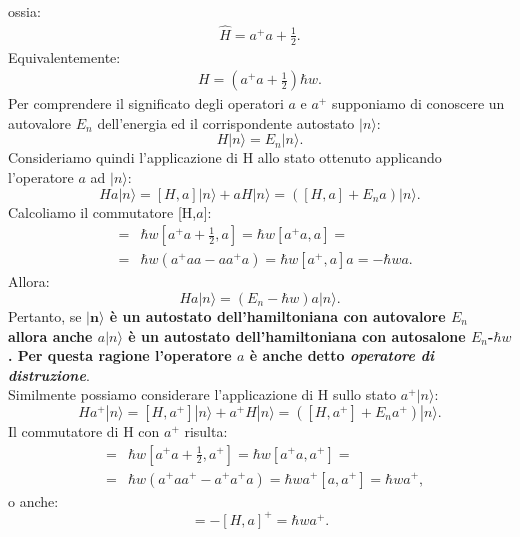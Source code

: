 ossia:
\begin{equation} 
\begin{split}
	\hat{H} =a^+a +\frac{1}{2}.
\end{split}
\end{equation}
Equivalentemente:
\begin{equation} \label{eq:cap11_6}
\begin{split}
	H =(a^+a+ \frac{1}{2}) \hbar w.
\end{split}
\end{equation}
Per comprendere il significato degli operatori $a$ e $a^+$ supponiamo di conoscere un autovalore $E_n$  dell'energia ed il corrispondente autostato $|n \rangle$:
\begin{equation}
H|n\rangle=E_n|n\rangle.
\end{equation}
Consideriamo quindi l'applicazione di H allo stato ottenuto applicando l'operatore $a$ ad $|n\rangle$:
\begin{equation}
Ha|n\rangle= [H,a]|n \rangle+aH|n\rangle=([H,a]+E_na)|n\rangle.
\end{equation}
Calcoliamo il commutatore [H,$a$]:
\begin{eqnarray}
	[H,a]&=&\hbar w[a^+a+\frac{1}{2},a]=\hbar w [a^+a,a]= \nonumber\\
	&=&\hbar w (a^+aa-aa^+a)=\hbar w[a^+,a]a=-\hbar wa.
\end{eqnarray}
Allora:
\begin{equation}
Ha|n\rangle=(E_n-\hbar w)a|n\rangle.
\end{equation}
Pertanto, se \textbf{$\mathbf{|n\rangle}$ è un autostato dell'hamiltoniana con autovalore $E_n$ allora anche $a|n\rangle$ è  un autostato dell'hamiltoniana con autosalone $E_n$-$\hbar w$. Per questa ragione l'operatore $a$ è anche detto \textit{operatore di distruzione}}.  \\
 Similmente possiamo considerare l'applicazione di H sullo stato $a^+|n\rangle$:
\begin{equation}
Ha^+|n\rangle= [H,a^+]|n\rangle+a^+H|n\rangle=([H,a^+]+E_na^+)|n\rangle.
\end{equation}
Il commutatore di H con $a^+$ risulta:
\begin{eqnarray}
	[H,a^+]&=&\hbar w[a^+a+\frac{1}{2},a^+]=\hbar w [a^+a,a^+]= \nonumber\\
	&=&\hbar w (a^+aa^+-a^+a^+a)=\hbar w a^+ [a,a^+]=\hbar wa^+,
\end{eqnarray}
o anche:
\begin{equation}
[H,a^+]=-[H,a]^+=\hbar w a^+.
\end{equation}
